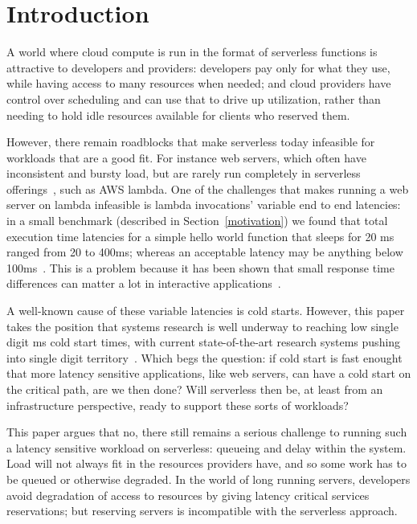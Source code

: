 \section{Introduction}

A world where cloud compute is run in the format of serverless functions is
attractive to developers and providers: developers pay only for what they use,
while having access to many resources when needed; and cloud providers have
control over scheduling and can use that to drive up utilization, rather than
needing to hold idle resources available for clients who reserved them.


However, there remain roadblocks that make serverless today infeasible for
workloads that are a good fit. For instance web servers, which often have
inconsistent and bursty load, but are rarely run completely in serverless
offerings~\cite{reddit-serverless1}, such as AWS lambda. One of the challenges
that makes running a web server on lambda infeasible is lambda invocations'
variable end to end latencies: in a small benchmark (described in
Section~\ref{motivation}) we found that total execution time latencies for a
simple hello world function that sleeps for 20 ms ranged from 20 to 400ms;
whereas an acceptable latency may be anything below 100ms~\cite{page-load-time}.
This is a problem because it has been shown that small response time differences
can matter a lot in interactive
applications~\cite{amz-page-load,google-page-load}.


A well-known cause of these variable latencies is cold starts. However, this
paper takes the position that systems research is well underway to reaching low
single digit ms cold start times, with current state-of-the-art research systems
pushing into single digit territory~\cite{sigmaos,mitosis}. Which begs the
question: if cold start is fast enought that more latency sensitive
applications, like web servers, can have a cold start on the critical path, are
we then done? Will serverless then be, at least from an infrastructure
perspective, ready to support these sorts of workloads?

This paper argues that no, there still remains a serious challenge to running
such a latency sensitive workload on serverless: queueing and delay within the
system. Load will not always fit in the resources providers have, and so some
work has to be queued or otherwise degraded. In the world of long running
servers, developers avoid degradation of access to resources by giving latency
critical services reservations; but reserving servers is incompatible with the
serverless approach. 


